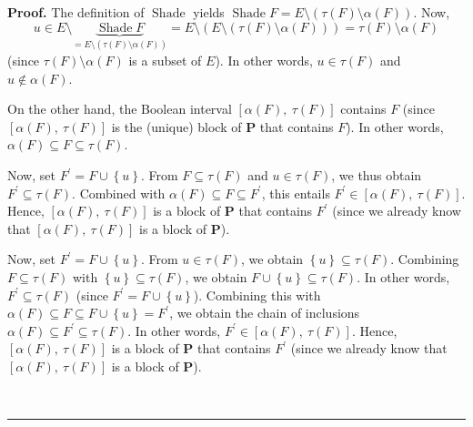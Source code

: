 \documentclass[numbers=enddot,12pt,final,onecolumn]{scrartcl}%
\theoremstyle{definition}
\newenvironment{proof}[1][Proof]{\noindent\textbf{#1.} }{\ \rule{0.5em}{0.5em}}
\newenvironment{verlong}{}{}
\newenvironment{vershort}{}{}
\begin{document}
\begin{proof}
The definition of $\operatorname*{Shade}$ yields $\operatorname*{Shade}%
F=E\setminus\left(  \tau\left(  F\right)  \setminus\alpha\left(  F\right)
\right)  $. Now,%
\[
u\in E\setminus\underbrace{\operatorname*{Shade}F}_{=E\setminus\left(
\tau\left(  F\right)  \setminus\alpha\left(  F\right)  \right)  }%
=E\setminus\left(  E\setminus\left(  \tau\left(  F\right)  \setminus
\alpha\left(  F\right)  \right)  \right)  =\tau\left(  F\right)
\setminus\alpha\left(  F\right)
\]
(since $\tau\left(  F\right)  \setminus\alpha\left(  F\right)  $ is a subset
of $E$). In other words, $u\in\tau\left(  F\right)  $ and $u\notin%
\alpha\left(  F\right)  $.

On the other hand, the Boolean interval $\left[  \alpha\left(  F\right)
,\ \tau\left(  F\right)  \right]  $ contains $F$ (since $\left[  \alpha\left(
F\right)  ,\ \tau\left(  F\right)  \right]  $ is the (unique) block of
$\mathbf{P}$ that contains $F$). In other words, $\alpha\left(  F\right)
\subseteq F\subseteq\tau\left(  F\right)  $.

\begin{vershort}
Now, set $F^{\prime}=F\cup\left\{  u\right\}  $. From $F\subseteq\tau\left(
F\right)  $ and $u\in\tau\left(  F\right)  $, we thus obtain $F^{\prime
}\subseteq\tau\left(  F\right)  $. Combined with $\alpha\left(  F\right)
\subseteq F\subseteq F^{\prime}$, this entails $F^{\prime}\in\left[
\alpha\left(  F\right)  ,\ \tau\left(  F\right)  \right]  $. Hence, $\left[
\alpha\left(  F\right)  ,\ \tau\left(  F\right)  \right]  $ is a block of
$\mathbf{P}$ that contains $F^{\prime}$ (since we already know that $\left[
\alpha\left(  F\right)  ,\ \tau\left(  F\right)  \right]  $ is a block of
$\mathbf{P}$).
\end{vershort}

\begin{verlong}
Now, set $F^{\prime}=F\cup\left\{  u\right\}  $. From $u\in\tau\left(
F\right)  $, we obtain $\left\{  u\right\}  \subseteq\tau\left(  F\right)  $.
Combining $F\subseteq\tau\left(  F\right)  $ with $\left\{  u\right\}
\subseteq\tau\left(  F\right)  $, we obtain $F\cup\left\{  u\right\}
\subseteq\tau\left(  F\right)  $. In other words, $F^{\prime}\subseteq
\tau\left(  F\right)  $ (since $F^{\prime}=F\cup\left\{  u\right\}  $).
Combining this with $\alpha\left(  F\right)  \subseteq F\subseteq
F\cup\left\{  u\right\}  =F^{\prime}$, we obtain the chain of inclusions
$\alpha\left(  F\right)  \subseteq F^{\prime}\subseteq\tau\left(  F\right)  $.
In other words, $F^{\prime}\in\left[  \alpha\left(  F\right)  ,\ \tau\left(
F\right)  \right]  $. Hence, $\left[  \alpha\left(  F\right)  ,\ \tau\left(
F\right)  \right]  $ is a block of $\mathbf{P}$ that contains $F^{\prime}$
(since we already know that $\left[  \alpha\left(  F\right)  ,\ \tau\left(
F\right)  \right]  $ is a block of $\mathbf{P}$).
\end{verlong}


\end{proof}
\end{document}
